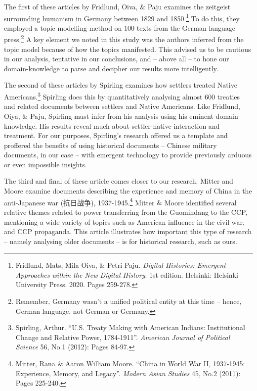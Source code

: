 \documentclass[12pt,letterpaper]{article}
\begin{document}
\begin{CJK*}{UTF8}{gbsn}
		\vspace{.35cm}
		
		\noindent The first of these articles by Fridlund, Oiva, $\&$ Paju examines the zeitgeist surrounding humanism in Germany between 1829 and 1850.\footnote{ Fridlund, Mats, Mila Oiva, $\&$ Petri Paju. \textit{Digital Histories: Emergent Approaches within the New Digital History}. 1st edition. Helsinki: Helsinki University Press. 2020. Pages 259-278.} To do this, they employed a topic modelling method on 100 texts from the German language press.\footnote{Remember, Germany wasn’t a unified political entity at this time – hence, German language, not German or Germany.} A key element we noted in this study was the authors inferred from the topic model because of how the topics manifested. This advised us to be cautious in our analysis, tentative in our conclusions, and – above all – to hone our domain-knowledge to parse and decipher our results more intelligently. 
		
		\vspace{.35cm}
		
		\noindent The second of these articles by Spirling examines how settlers treated Native Americans.\footnote{ Spirling, Arthur. “U.S. Treaty Making with American Indians: Institutional Change and Relative Power, 1784-1911”. \textit{American Journal of Political Science} 56, No.1 (2012): Pages 84-97.} Spirling does this by quantitatively analysing almost 600 treaties and related documents between settlers and Native Americans. Like Fridlund, Oiya, $\&$ Paju, Spirling must infer from his analysis using his eminent domain knowledge. His results reveal much about settler-native interaction and treatment. For our purposes, Spirling’s research offered us a template and proffered the benefits of using historical documents – Chinese military documents, in our case – with emergent technology to provide previously arduous or even impossible insights.
		
		\vspace{.35cm}
		
		\noindent The third and final of these article comes closer to our research. Mitter and Moore examine documents describing the experience and memory of China in the anti-Japanese war (抗日战争), 1937-1945.\footnote{ Mitter, Rana $\&$ Aaron William Moore. “China in World War II, 1937-1945: Experience, Memory, and Legacy”. \textit{Modern Asian Studies} 45, No.2 (2011): Pages 225-240.} Mitter $\&$ Moore identified several relative themes related to power transferring from the Guomindang to the CCP, mentioning a wide variety of topics such as American influence in the civil war, and CCP propaganda. This article illustrates how important this type of research – namely analysing older documents – is for historical research, such as ours. 
		\vspace{.5cm}
		\maketitle

\end{CJK*}
\end{document}
